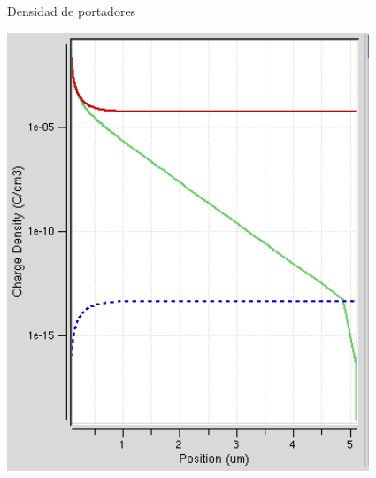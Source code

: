 \documentclass{/home/daniel/GitHub/USC-Physics-Degree-Notes/Notes/Presentacion}
\begin{document}
\begin{frame}{Densidad de portadores}
\begin{minipage}{0.55\linewidth}
        \includegraphics[width=0.65\linewidth]{../Imagenes/2-Charge.png}
    \end{minipage}
\end{frame}
\end{document}
